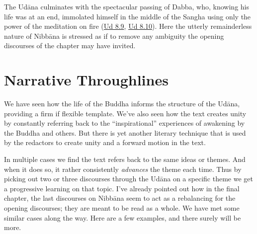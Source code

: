 \documentclass[12pt,openany]{book}%
\begin{document}
The \textsanskrit{Udāna} culminates with the spectacular passing of Dabba, who, knowing his life was at an end, immolated himself in the middle of the Sangha using only the power of the meditation on fire (\href{https://suttacentral.net/ud8.9/en/sujato}{Ud 8.9}, \href{https://suttacentral.net/ud8.10/en/sujato}{Ud 8.10}). Here the utterly remainderless nature of \textsanskrit{Nibbāna} is stressed as if to remove any ambiguity the opening discourses of the chapter may have invited. 

\section*{Narrative Throughlines}

We have seen how the life of the Buddha informs the structure of the \textsanskrit{Udāna}, providing a firm if flexible template. We’ve also seen how the text creates unity by constantly referring back to the “inspirational” experiences of awakening by the Buddha and others. But there is yet another literary technique that is used by the redactors to create unity and a forward motion in the text. 

In multiple cases we find the text refers back to the same ideas or themes. And when it does so, it rather consistently \emph{advances} the theme each time. Thus by picking out two or three discourses through the \textsanskrit{Udāna} on a specific theme we get a progressive learning on that topic. I’ve already pointed out how in the final chapter, the last discourses on \textsanskrit{Nibbāna} seem to act as a rebalancing for the opening discourses; they are meant to be read as a whole. We have met some similar cases along the way. Here are a few examples, and there surely will be more.
\end{document}
